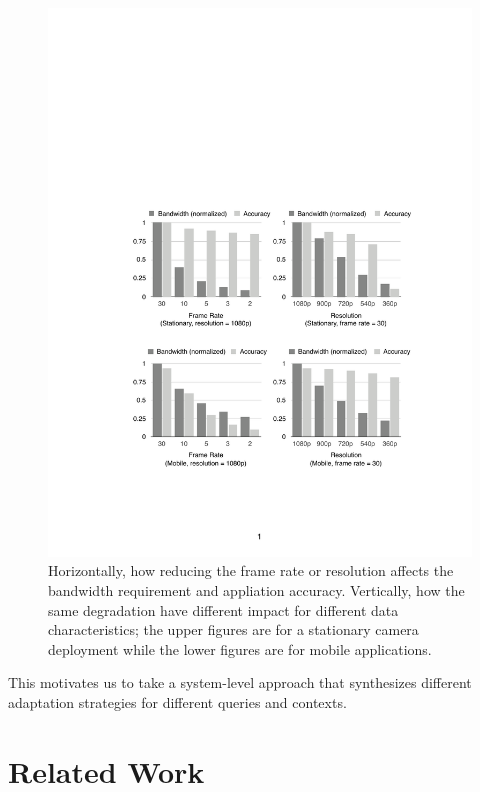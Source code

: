 \documentclass[thesis.tex]{subfiles}
\begin{document}
\begin{figure}
  \centering
  \includegraphics[width=\linewidth]{figures/motiv.pdf}
  \caption{Horizontally, how reducing the frame rate or resolution affects the
    bandwidth requirement and appliation accuracy. Vertically, how the same
    degradation have different impact for different data characteristics; the
    upper figures are for a stationary camera deployment while the lower figures
    are for mobile applications.}
  \label{fig:motiv}
\end{figure}

This motivates us to take a system-level approach that synthesizes different
adaptation strategies for different queries and contexts.

\section{Related Work}
\label{sec:related-work}
\end{document}
